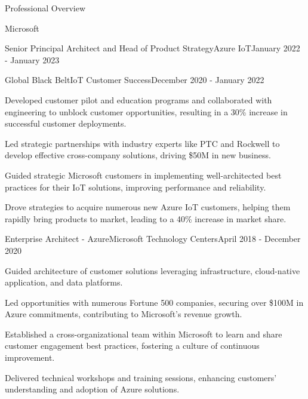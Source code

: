 \documentclass{resume} %
\begin{document}
\begin{rSection}{Professional Overview}
\begin{rCompany}{Microsoft}{}{}
\begin{rSubSubsection}{Senior Principal Architect and Head of Product Strategy}{Azure IoT}{January 2022 - January 2023}
    \end{rSubSubsection}
    
    \begin{rSubSubsection}{Global Black Belt}{IoT Customer Success}{December 2020 - January 2022}
        \item Developed customer pilot and education programs and collaborated with engineering to unblock customer opportunities, resulting in a 30\% increase in successful customer deployments.
        \item Led strategic partnerships with industry experts like PTC and Rockwell to develop effective cross-company solutions, driving \$50M in new business.
        \item Guided strategic Microsoft customers in implementing well-architected best practices for their IoT solutions, improving performance and reliability.
        \item Drove strategies to acquire numerous new Azure IoT customers, helping them rapidly bring products to market, leading to a 40\% increase in market share.
    \end{rSubSubsection}
    
    \begin{rSubSubsection}{Enterprise Architect - Azure}{Microsoft Technology Centers}{April 2018 - December 2020}
        \item Guided architecture of customer solutions leveraging infrastructure, cloud-native application, and data platforms.
        \item Led opportunities with numerous Fortune 500 companies, securing over \$100M in Azure commitments, contributing to Microsoft's revenue growth.
        \item Established a cross-organizational team within Microsoft to learn and share customer engagement best practices, fostering a culture of continuous improvement.
        \item Delivered technical workshops and training sessions, enhancing customers' understanding and adoption of Azure solutions.
    \end{rSubSubsection}
  \end{rCompany}


\end{rSection}
\end{document}
